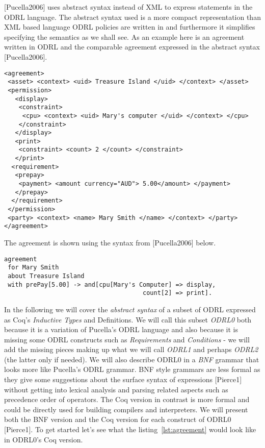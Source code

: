 [Pucella2006] uses abstract syntax instead of XML to express statements in the ODRL language. The abstract syntax used is a more compact representation than XML based language ODRL policies are written in and furthermore it simplifies specifying the semantics as we shall see. As an example here is an agreement written in ODRL and the comparable agreement expressed in the abstract syntax [Pucella2006].

\lstset{language=XML}
\begin{lstlisting}[caption={The Agreement in XML},label={lst:agreementxml}]
<agreement>
 <asset> <context> <uid> Treasure Island </uid> </context> </asset>
 <permission>
   <display>
    <constraint>
     <cpu> <context> <uid> Mary's computer </uid> </context> </cpu>
    </constraint>
   </display>
   <print>
    <constraint> <count> 2 </count> </constraint>
   </print>
  <requirement>
   <prepay>
    <payment> <amount currency="AUD"> 5.00</amount> </payment>
   </prepay>
  </requirement>
 </permission>
 <party> <context> <name> Mary Smith </name> </context> </party>
</agreement>
\end{lstlisting}
The agreement is shown using the syntax from [Pucella2006] below.

\lstset{language=Pucella2006}
\begin{lstlisting}[caption={The Agreement As Pucella2006},label={lst:agreementpucella2006}]
agreement
 for Mary Smith 
 about Treasure Island 
 with prePay[5.00] -> and[cpu[Mary's Computer] => display,
                                      count[2] => print].
\end{lstlisting}
 

In the following we will cover the \emph{abstract syntax} of a subset of ODRL expressed as Coq's \emph{Inductive Types} and Definitions. We will call this subset \emph{ODRL0} both because it is a variation of Pucella's ODRL language and also because it is missing some ODRL constructs such as \emph{Requirements} and \emph{Conditions} - we will add the missing pieces making up what we will call \emph{ODRL1} and perhaps \emph{ODRL2} (the latter only if needed). We will also describe ODRL0 in a \emph{BNF} grammar that looks more like Pucella's ODRL grammar. BNF style grammars are less formal as they give some suggestions about the surface syntax of expressions [Pierce1] without getting into lexical analysis and parsing related aspects such as precedence order of operators. The Coq version in contrast is more formal and could be directly used for building compilers and interpreters. We will present both the BNF version and the Coq version for each construct of ODRL0 [Pierce1]. To get started let's see what the listing~\ref{lst:agreement} would look like in ODRL0's Coq version.


